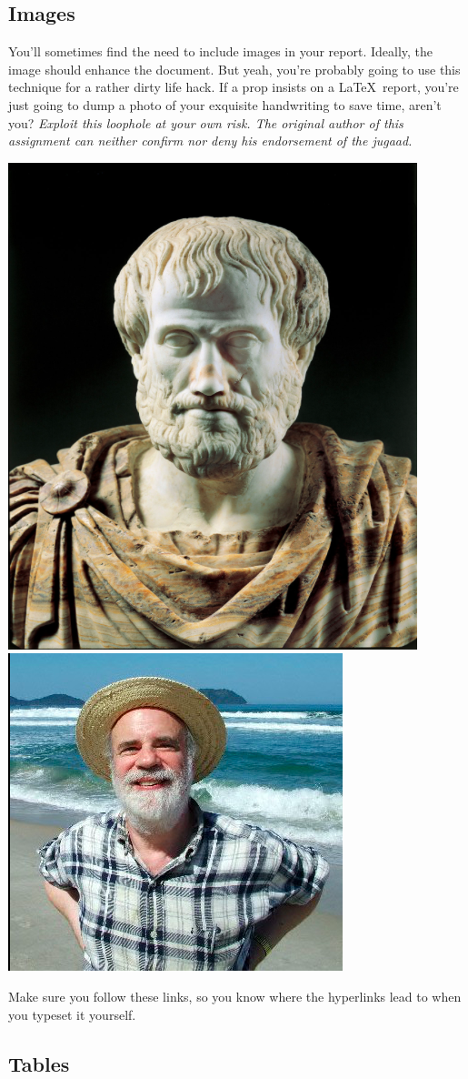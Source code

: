 \documentclass[10pt, Computer Modern]{article}
\begin{document}
	\subsection{Images}


	You'll sometimes find the need to include images in your report. Ideally, the image should enhance the document. But yeah, you're probably going to use this technique for a rather dirty life hack. If a prop insists on a \LaTeX\ report, you're just going to dump a photo of your exquisite handwriting to save time, aren't you? \textit{Exploit this loophole at your own risk. The original author of this assignment can neither confirm nor deny his endorsement of the jugaad.}
	
	\includegraphics[scale=0.4]{aristotle.png}
	\includegraphics[scale=0.6]{kripke.png}



	Make sure you follow these links, so you know where the hyperlinks lead to when you typeset it yourself.

	\subsection{Tables}
	\clearpage

	
	


\end{document}
